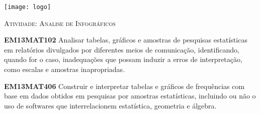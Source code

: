 \documentclass[10 pt,usenames,dvipsnames, oneside]{article}
\begin{document}
\begin{center}
  \begin{minipage}[l]{3cm}
\texttt{[image: logo]}    
\end{minipage}\hfill
\begin{minipage}[r]{.8\textwidth}
 {\Large \scshape Atividade: Analise de Infográficos}  
\end{minipage}
\end{center}
\vspace{.2cm}

\ifdefined\prof
\begin{objetivos}
\item \textbf{EM13MAT102} Analisar tabelas, gráficos e amostras de pesquisas estatísticas em relatórios divulgados por diferentes meios de comunicação, identificando, quando for o caso, inadequações que possam induzir a erros de interpretação, como escalas e amostras inapropriadas.

\item \textbf{EM13MAT406} Construir e interpretar tabelas e gráficos de frequências com base em dados obtidos em pesquisas por amostras estatísticas, incluindo ou não o uso de softwares que interrelacionem estatística, geometria e álgebra.
\end{objetivos}
\end{document}
